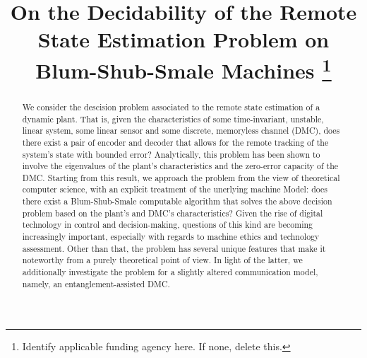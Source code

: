 \documentclass[conference]{IEEEtran}
\begin{document}
%
	\title{On the Decidability of the Remote State Estimation Problem on Blum-Shub-Smale Machines
	\thanks{{\color{red} Identify applicable funding agency here. If none, delete this.}}
	}

	\author{
	\and
	\and
	}

\maketitle

\begin{abstract}
	We consider the descision problem associated to the remote state estimation of a dynamic plant. 
	That is, given the characteristics of some time-invariant, unstable, linear system, some linear sensor and some discrete, 
	memoryless channel (DMC), does there exist a pair of encoder and decoder that allows for the remote tracking of the system's 
	state with bounded error? Analytically, this problem has been shown to involve the eigenvalues of the plant's characteristics 
	and the zero-error capacity of the DMC. Starting from this result, we approach the problem from the view of theoretical computer science, 
	with an explicit treatment of the unerlying machine Model: does there exist a Blum-Shub-Smale computable algorithm that solves the above 
	decision problem based on the plant's and DMC's characteristics? Given the rise of digital technology in control and decision-making, 
	questions of this kind are becoming increasingly important, especially with regards to machine ethics and technology assessment. 
	Other than that, the problem has several unique features that make it noteworthy from a purely theoretical point of view. In light of the latter, we additionally
	investigate the problem for a slightly altered communication model, namely, an entanglement-assisted DMC. 
\end{abstract}
\end{document}
